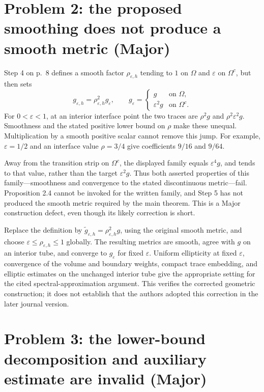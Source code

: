 \documentclass[10pt]{article}
\begin{document}
\section*{Problem 2: the proposed smoothing does not produce a smooth metric (Major)}
Step 4 on p. 8 defines a smooth factor \(\rho_{\varepsilon,h}\) tending to \(1\) on \(\Omega\) and \(\varepsilon\) on \(\Omega^c\), but then sets \[g_{\varepsilon,h}=\rho_{\varepsilon,h}^2g_\varepsilon,
 \qquad
 g_\varepsilon=\begin{cases}g&\text{on }\Omega,\\
                         \varepsilon^2g&\text{on }\Omega^c.
             \end{cases}\] For \(0<\varepsilon<1\), at an interior interface point the two traces are \(\rho^2g\) and \(\rho^2\varepsilon^2g\). Smoothness and the stated positive lower bound on \(\rho\) make these unequal. Multiplication by a smooth positive scalar cannot remove this jump. For example, \(\varepsilon=1/2\) and an interface value \(\rho=3/4\) give coefficients \(9/16\) and \(9/64\).\par
Away from the transition strip on \(\Omega^c\), the displayed family equals \(\varepsilon^4g\), and tends to that value, rather than the target \(\varepsilon^2g\). Thus both asserted properties of this family—smoothness and convergence to the stated discontinuous metric—fail. Proposition 2.4 cannot be invoked for the written family, and Step 5 has not produced the smooth metric required by the main theorem. This is a Major construction defect, even though its likely correction is short.\par
Replace the definition by \(\widetilde g_{\varepsilon,h}=\rho_{\varepsilon,h}^2g\), using the original smooth metric, and choose \(\varepsilon\leq\rho_{\varepsilon,h}\leq1\) globally. The resulting metrics are smooth, agree with \(g\) on an interior tube, and converge to \(g_\varepsilon\) for fixed \(\varepsilon\). Uniform ellipticity at fixed \(\varepsilon\), convergence of the volume and boundary weights, compact trace embedding, and elliptic estimates on the unchanged interior tube give the appropriate setting for the cited spectral-approximation argument. This verifies the corrected geometric construction; it does not establish that the authors adopted this correction in the later journal version.\par
\section*{Problem 3: the lower-bound decomposition and auxiliary estimate are invalid (Major)}
\end{document}
